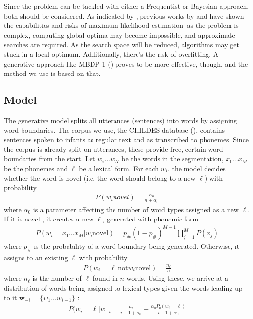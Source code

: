 \documentclass[11pt]{article}
\begin{document}
Since the problem can be tackled with either a Frequentist or Bayesian approach, both should be considered. As indicated by \cite{goldwater2009}, previous works by \cite{venkataraman2001} and \cite{batchelder2001} have shown the capabilities and risks of maximum likelihood estimation; as the problem is complex, computing global optima may become impossible, and approximate searches are required. As the search space will be reduced, algorithms may get stuck in a local optimum. Additionally, there's the risk of overfitting. A generative approach like MBDP-1 (\cite{brent1999}) proves to be more effective, though, and the method we use is based on that.

\subsection{Model}
The generative model splits all utterances (sentences) into words by assigning word boundaries. The corpus we use, the CHILDES database (\cite{mac1985}), contains sentences spoken to infants as regular text and as transcribed to phonemes. Since the corpus is already split on utterances, these provide free, certain word boundaries from the start. Let $w_i ... w_N$ be the words in the segmentation, $x_1 ... x_M$ be the phonemes and $\ell$ be a lexical form. For each $w_i$, the model decides whether the word is novel (i.e. the word should belong to a new $\ell$) with probability
\begin{align}
P(w_i novel) = \frac{\alpha_0}{n+\alpha_0}
\end{align}
where $\alpha_0$ is a parameter affecting the number of word types assigned as a new $\ell$. If it is novel , it creates a new $\ell$, generated with phonemic form
\begin{align}
P(w_i = x_1 ... x_M | w_i  \text{novel}) = p_\# (1-p_\#)^{M-1} \prod_{j=1}^M P(x_j)
\end{align}
where $p_\#$ is the probability of a word boundary being generated. Otherwise, it assigns to an existing $\ell$ with probability
\begin{align}
P(w_i = \ell | \text{not} w_i \text{novel}) = \frac{n_\ell}{n}
\end{align}
where $n_\ell$ is the number of $\ell$ found in $n$ words. Using these, we arrive at a distribution of words being assigned to lexical types given the words leading up to it $\textbf{w}_{-i} = \{ w_1 ... w_{i-1}\}$ :
\begin{align}
P(w_i = \ell | w_{-i} = \frac{n_\ell}{i-1+\alpha_0} + \frac{\alpha_0 P_0 (w_i = \ell )}{i - 1 + \alpha_0}
\end{align}
\end{document}
